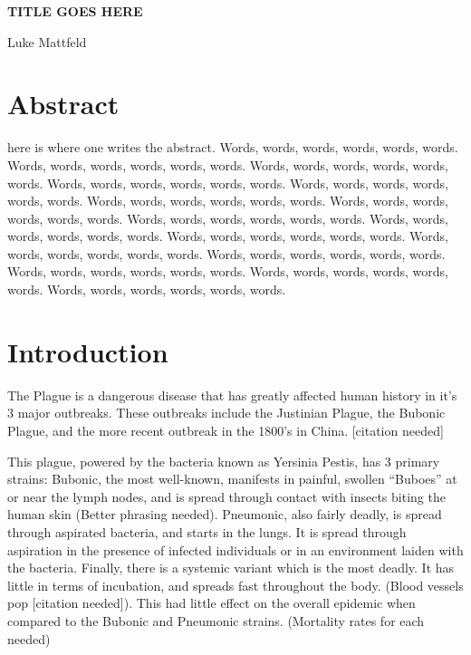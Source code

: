 \documentclass [letterpaper, 12pt] {article}
\begin{document}
	\begin{titlepage}
	\centering
	\vspace*{\fill}

	\vspace*{0.5cm}

	\huge\bfseries
	TITLE GOES HERE
	
	\vspace*{0.5cm}

	\large Luke Mattfeld

	\vspace*{\fill}
	\end{titlepage}

\tableofcontents
\newpage
{}

\section {Abstract}

here is where one writes the abstract.  Words, words, words, words, words, words.  Words, words, words, words, words, words. Words, words, words, words, words, words. Words, words, words, words, words, words. Words, words, words, words, words, words. Words, words, words, words, words, words. Words, words, words, words, words, words. Words, words, words, words, words, words. Words, words, words, words, words, words. Words, words, words, words, words, words. Words, words, words, words, words, words. Words, words, words, words, words, words. Words, words, words, words, words, words. Words, words, words, words, words, words. Words, words, words, words, words, words.
\pagebreak

\section {Introduction}

The Plague is a dangerous disease that has greatly affected human history in it’s 3 major outbreaks. These outbreaks include the Justinian Plague, the Bubonic Plague, and the more recent outbreak in the 1800’s in China. [citation needed]

This plague, powered by the bacteria known as Yersinia Pestis, has 3 primary strains:
Bubonic, the most well-known, manifests in painful, swollen “Buboes” at or near the lymph nodes, and is spread through contact with insects biting the human skin (Better phrasing needed).
Pneumonic, also fairly deadly, is spread through aspirated bacteria, and starts in the lungs. It is spread through aspiration in the presence of infected individuals or in an environment laiden with the bacteria.
Finally, there is a systemic variant which is the most deadly. It has little in terms of incubation, and spreads fast throughout the body. (Blood vessels pop [citation needed]). This had little effect on the overall epidemic when compared to the Bubonic and Pneumonic strains.
(Mortality rates for each needed)
\end{document}
